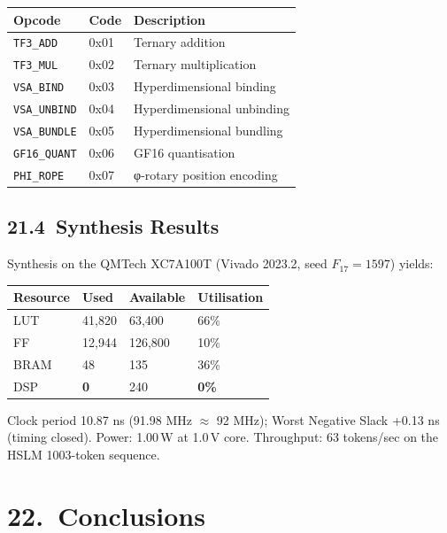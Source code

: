 \begin{longtable}[]{@{}lll@{}}
\toprule\noalign{}
Opcode & Code & Description \\
\midrule\noalign{}
\endhead
\bottomrule\noalign{}
\endlastfoot
\texttt{TF3\_ADD}    & 0x01 & Ternary addition \\
\texttt{TF3\_MUL}    & 0x02 & Ternary multiplication \\
\texttt{VSA\_BIND}   & 0x03 & Hyperdimensional binding \\
\texttt{VSA\_UNBIND} & 0x04 & Hyperdimensional unbinding \\
\texttt{VSA\_BUNDLE} & 0x05 & Hyperdimensional bundling \\
\texttt{GF16\_QUANT} & 0x06 & GF16 quantisation \\
\texttt{PHI\_ROPE}   & 0x07 & φ-rotary position encoding \\
\end{longtable}

\subsection{21.4\ Synthesis Results}

Synthesis on the QMTech XC7A100T (Vivado 2023.2, seed
\(F_{17} = 1597\)) yields:

\begin{longtable}[]{@{}llll@{}}
\toprule\noalign{}
Resource & Used & Available & Utilisation \\
\midrule\noalign{}
\endhead
\bottomrule\noalign{}
\endlastfoot
LUT  & 41,820 & 63,400 & 66\% \\
FF   & 12,944 & 126,800 & 10\% \\
BRAM & 48 & 135 & 36\% \\
DSP  & \textbf{0} & 240 & \textbf{0\%} \\
\end{longtable}

Clock period 10.87 ns (91.98 MHz \(\approx\) 92 MHz); Worst Negative
Slack +0.13 ns (timing closed).  Power: 1.00\,W at 1.0\,V core.
Throughput: 63 tokens/sec on the HSLM 1003-token sequence.

\section{22.\ Conclusions}\label{sec:ch26-conclusions}

